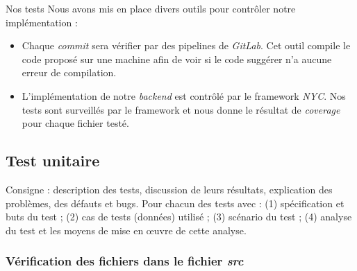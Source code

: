 \newenvironment{mytest}[4]
{
    \begin{center}
        \centering
        \begin{tabular}[h]{|m{4cm}|m{12cm}|}
            \hline
            \rowcolor[HTML]{F8B400}
            \textbf{But}    & #1 \\
            \hline
            \hline
            \rowcolor[HTML]{F7F7F7}
            Entrée          & #2 \\
            \hline
            \rowcolor[HTML]{F7F7F7}
            Scénario        & #3 \\
            \hline
            \rowcolor[HTML]{F7F7F7}
            Analyse du test & #4 \\
            \hline
        \end{tabular}
    \end{center}
}

\section{Nos tests}
Nous avons mis en place divers outils pour contrôler notre implémentation :
\begin{itemize}
    \item Chaque \emph{commit} sera vérifier par des pipelines de \emph{GitLab}. Cet outil compile le code proposé sur une machine afin de voir si le code suggérer n'a aucune erreur de compilation.
    \item L'implémentation de notre \emph{backend} est contrôlé par le framework \emph{NYC}. Nos tests sont surveillés par le framework et nous donne le résultat de \emph{coverage} pour chaque fichier testé.
\end{itemize}

\subsection{Test unitaire}

Consigne : description des tests, discussion de leurs résultats, explication des problèmes, des défauts et bugs. Pour chacun des tests avec : (1) spécification et buts du test ;
(2) cas de tests (données) utilisé ; (3) scénario du test ; (4) analyse du test et les moyens de mise en œuvre de cette analyse.

\subsubsection{Vérification des fichiers dans le fichier \emph{src}}

